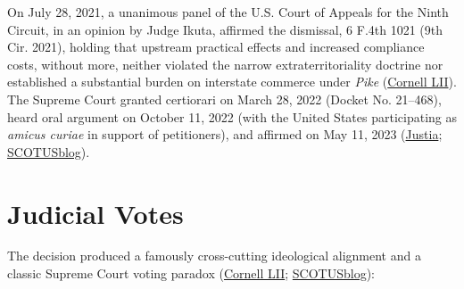 \documentclass[12pt]{article}
\begin{document}
On July 28, 2021, a unanimous panel of the U.S. Court of Appeals for the Ninth Circuit, in an opinion by Judge Ikuta, affirmed the dismissal, 6 F.4th 1021 (9th Cir. 2021), holding that upstream practical effects and increased compliance costs, without more, neither violated the narrow extraterritoriality doctrine nor established a substantial burden on interstate commerce under \textit{Pike} (\href{https://www.law.cornell.edu/supremecourt/text/21-468}{Cornell LII}). The Supreme Court granted certiorari on March 28, 2022 (Docket No. 21--468), heard oral argument on October 11, 2022 (with the United States participating as \textit{amicus curiae} in support of petitioners), and affirmed on May 11, 2023 (\href{https://supreme.justia.com/cases/federal/us/598/21-468/}{Justia}; \href{https://www.scotusblog.com/cases/national-pork-producers-council-v-ross/}{SCOTUSblog}).

\section{Judicial Votes}
The decision produced a famously cross-cutting ideological alignment and a classic Supreme Court voting paradox (\href{https://www.law.cornell.edu/supremecourt/text/21-468}{Cornell LII}; \href{https://www.scotusblog.com/cases/national-pork-producers-council-v-ross/}{SCOTUSblog}):
\end{document}
